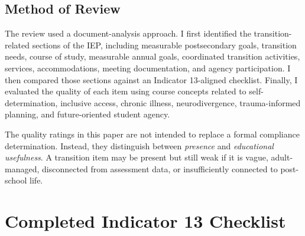 \documentclass[11pt]{article}
\begin{document}
\subsection{Method of Review}

The review used a document-analysis approach. I first identified the transition-related sections of the IEP, including measurable postsecondary goals, transition needs, course of study, measurable annual goals, coordinated transition activities, services, accommodations, meeting documentation, and agency participation. I then compared those sections against an Indicator 13-aligned checklist. Finally, I evaluated the quality of each item using course concepts related to self-determination, inclusive access, chronic illness, neurodivergence, trauma-informed planning, and future-oriented student agency.

The quality ratings in this paper are not intended to replace a formal compliance determination. Instead, they distinguish between \textit{presence} and \textit{educational usefulness}. A transition item may be present but still weak if it is vague, adult-managed, disconnected from assessment data, or insufficiently connected to post-school life.

\newpage
\section{Completed Indicator 13 Checklist}

\begin{center}
\end{center}
\end{document}
